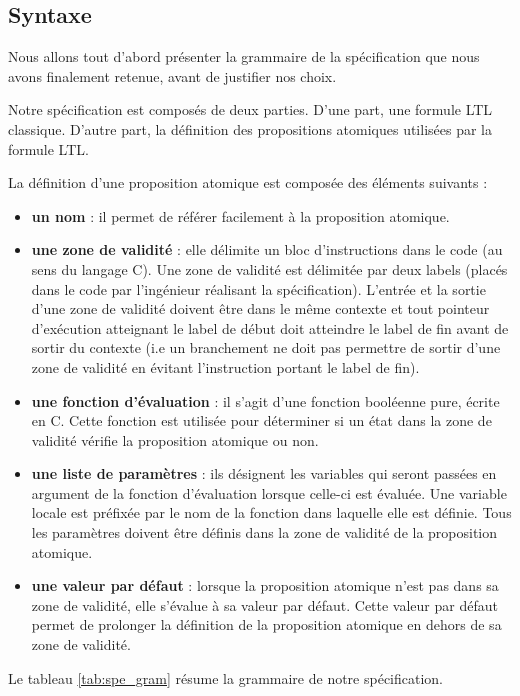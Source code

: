 \subsection{Syntaxe}

Nous allons tout d'abord présenter la grammaire de la spécification que
nous avons finalement retenue, avant de justifier nos choix.

Notre spécification est composés de deux parties. D'une part, une formule LTL
classique. D'autre part, la définition des propositions atomiques utilisées
par la formule LTL.

La définition d'une proposition atomique est composée des éléments suivants :

\begin{itemize}
\item
  \textbf{un nom} : il permet de référer facilement à la proposition atomique.
\item
  \textbf{une zone de validité} : elle délimite un bloc d'instructions dans
  le code (au sens du langage C). Une zone de validité est délimitée par deux
  labels (placés dans le code par l'ingénieur réalisant la spécification).
  L'entrée et la sortie d'une zone de validité doivent être dans le même
  contexte et tout pointeur d'exécution atteignant le label de début doit
  atteindre le label de fin avant de sortir du contexte (i.e un branchement ne
  doit pas permettre de sortir d'une zone de validité en évitant l'instruction
  portant le label de fin).
\item
  \textbf{une fonction d'évaluation} : il s'agit d'une fonction booléenne pure,
  écrite en C. Cette fonction est utilisée pour déterminer si un état
  dans la zone de validité vérifie la proposition atomique ou non.
\item
\textbf{une liste de paramètres} : ils désignent les variables qui seront
  passées en argument de la fonction d'évaluation lorsque celle-ci est évaluée.
  Une variable locale est préfixée par le nom de la fonction dans laquelle elle
  est définie. Tous les paramètres doivent être définis dans la zone de validité
  de la proposition atomique.
\item
  \textbf{une valeur par défaut} : lorsque la proposition atomique n'est pas dans
  sa zone de validité, elle s'évalue à sa valeur par défaut. Cette valeur par
  défaut permet de prolonger la définition de la proposition atomique en dehors
  de sa zone de validité.
\end{itemize}

Le tableau \ref{tab:spe_gram} résume la grammaire de notre spécification.

